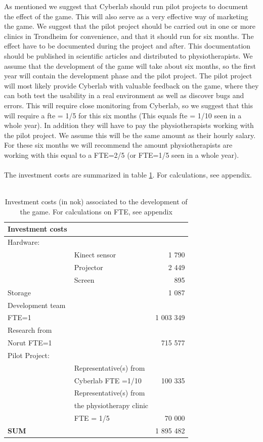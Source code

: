 As mentioned we suggest that Cyberlab should run pilot projects to document the effect of the game. This will also serve as a very effective way of marketing the game. We suggest that the pilot project should be carried out in one or more clinics in Trondheim for convenience, and that it should run for six months. The effect have to be documented during the project and after. This documentation should be published in scientific articles and distributed to physiotherapists. We assume that the development of the game will take about six months, so the first year will contain the development phase and the pilot project. The pilot project will most likely provide Cyberlab with valuable feedback on the game, where they can both test the usability in a real environment as well as discover bugs and errors. This will require close monitoring from Cyberlab, so we suggest that this will require a \ac{fte} = 1/5 for this six months (This equals \ac{fte} = 1/10 seen in a whole year). In addition they will have to pay the physiotherapists working with the pilot project. We assume this will be the same amount as their hourly salary. For these six months we will recommend the amount physiotherapists are working with this equal to a FTE=2/5 (or FTE=1/5 seen in a whole year).\\ \\
The investment costs are summarized in table \ref{tab:investmentcosts}. For calculations, see appendix. \\ \\
\begin{table}
\centering
    \begin{tabular}{|l|l|r|}
        \hline
       \textbf{Investment costs}  & &\\ \hline
       Hardware: & & \\ \hline
	   & Kinect sensor & 1 790  \\ \hline
	   & Projector & 2 449 \\ \hline
	   & Screen & 895 \\ \hline
	   Storage & & 1 087 \\ \hline
	   Development team & & \\  
	   FTE=1 &  & 1 003 349   \\ \hline
	   Research from & & \\ 
	   Norut FTE=1 & & 715 577 \\ \hline
	   Pilot Project: & & \\ \hline
	   & Representative(s) from & \\
	   & Cyberlab FTE =1/10 & 100 335  \\ \hline
	   & Representative(s) from & \\
	   & the physiotherapy clinic & \\
	   & FTE = 1/5 & 70 000  \\ \hline
	   \textbf{SUM} & & 1 895 482 
 \\ \hline
    \end{tabular}
    \caption[Investment costs associated to the development of the game]{Investment costs (in \ac{nok}) associated to the development of the game. For calculations on FTE, see appendix}
    \label{tab:investmentcosts}
\end{table}
